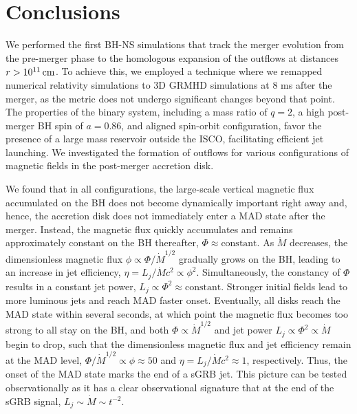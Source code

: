 \documentclass[twocolumn,dvipsnames]{aastex62}
\begin{document}
\section{Conclusions}\label{sec:conclusions}

We performed the first BH-NS simulations that track the merger evolution from the pre-merger phase to the homologous expansion of the outflows at distances $ r > 10^{11}\,{\rm cm} $. To achieve this, we employed a technique where we remapped numerical relativity simulations to 3D GRMHD simulations at 8 ms after the merger, as the metric does not undergo significant changes beyond that point. The properties of the binary system, including a mass ratio of $ q = 2 $, a high post-merger BH spin of $ a = 0.86 $, and aligned spin-orbit configuration, favor the presence of a large mass reservoir outside the ISCO, facilitating efficient jet launching. We investigated the formation of outflows for various configurations of magnetic fields in the post-merger accretion disk.

We found that in all configurations, the large-scale vertical magnetic flux accumulated on the BH does not become dynamically important right away and, hence, the accretion disk does not immediately enter a MAD state after the merger. Instead, the magnetic flux quickly accumulates and remains approximately constant on the BH thereafter,  $\Phi\approx \text{constant}$. As $\dot M$ decreases, the dimensionless magnetic flux $\phi\propto \Phi/\dot{M}^{1/2}$ gradually grows on the BH, leading to an increase in jet efficiency, $\eta = L_j/\dot M c^2 \propto \phi^2$. Simultaneously, the constancy of $\Phi$ results in a constant jet power, $L_j \propto \Phi^2 \approx \text{constant}$. Stronger initial fields lead to more luminous jets and reach MAD faster onset. Eventually, all disks reach the MAD state within several seconds, at which point the magnetic flux becomes too strong to all stay on the BH, and both $\Phi \propto \dot M^{1/2}$ and jet power $L_j \propto \Phi^2 \propto \dot M$ begin to drop, such that the dimensionless magnetic flux and jet efficiency remain at the MAD level, $\Phi/\dot M^{1/2} \propto \phi \approx 50$ and $\eta = L_j/\dot M c^2 \approx 1$, respectively. Thus, the onset of the MAD state marks the end of a sGRB jet. This picture can be tested observationally as it has a clear observational signature that at the end of the sGRB signal, $ L_j \sim \dot{M} \sim t^{-2} $.
\end{document}
